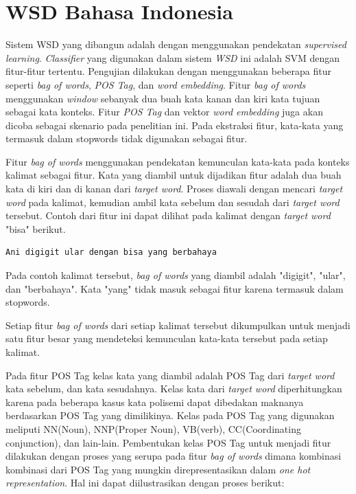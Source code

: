 \section{WSD Bahasa Indonesia} \label{sec:Sistem WSD}
Sistem WSD yang dibangun adalah dengan menggunakan pendekatan \textit{supervised learning}. \textit{Classifier} yang digunakan dalam sistem \textit{WSD} ini adalah SVM dengan fitur-fitur tertentu. Pengujian dilakukan dengan menggunakan beberapa fitur seperti \textit{bag of words}, \textit{POS Tag}, dan \textit{word embedding}. Fitur \textit{bag of words} menggunakan \textit{window} sebanyak dua buah kata kanan dan kiri kata tujuan sebagai kata konteks. Fitur \textit{POS Tag} dan vektor \textit{word embedding} juga akan dicoba sebagai skenario pada penelitian ini. Pada ekstraksi fitur, kata-kata yang termasuk dalam stopwords \citep{tala2003study} tidak digunakan sebagai fitur.

Fitur \textit{bag of words} menggunakan pendekatan kemunculan kata-kata pada konteks kalimat sebagai fitur. Kata yang diambil untuk dijadikan fitur adalah dua buah kata di kiri dan di kanan dari \textit{target word}. Proses diawali dengan mencari \textit{target word} pada kalimat, kemudian ambil kata sebelum dan sesudah dari \textit{target word} tersebut. Contoh dari fitur ini dapat dilihat pada kalimat dengan \textit{target word} "bisa" berikut.
\begin{lstlisting}[backgroundcolor = \color{white}]
Ani digigit ular dengan bisa yang berbahaya
\end{lstlisting}
Pada contoh kalimat tersebut, \textit{bag of words} yang diambil adalah "digigit", "ular", dan "berbahaya". Kata "yang" tidak masuk sebagai fitur karena termasuk dalam stopwords. 

Setiap fitur \textit{bag of words} dari setiap kalimat tersebut dikumpulkan untuk menjadi satu fitur besar yang mendeteksi kemunculan kata-kata tersebut pada setiap kalimat.

Pada fitur POS Tag kelas kata yang diambil adalah POS Tag dari \textit{target word} kata sebelum, dan kata sesudahnya. Kelas kata dari \textit{target word} diperhitungkan karena pada beberapa kasus kata polisemi dapat dibedakan maknanya berdasarkan POS Tag yang dimilikinya. Kelas pada POS Tag yang digunakan meliputi NN(Noun), NNP(Proper Noun), VB(verb), CC(Coordinating conjunction), dan lain-lain. Pembentukan kelas POS Tag untuk menjadi fitur dilakukan dengan proses yang serupa pada fitur \textit{bag of words} dimana kombinasi kombinasi dari POS Tag yang mungkin direpresentasikan dalam \textit{one hot representation}. Hal ini dapat diilustrasikan dengan proses berikut:

